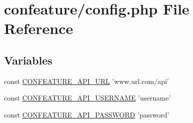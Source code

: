 \hypertarget{config_8php}{\section{confeature/config.php File Reference}
\label{config_8php}
}
\subsection*{Variables}
\begin{DoxyCompactItemize}
\item 
const \hyperlink{config_8php_afbb16ca52762e87195663d3710de52cc}{C\-O\-N\-F\-E\-A\-T\-U\-R\-E\-\_\-\-A\-P\-I\-\_\-\-U\-R\-L} 'www.\-url.\-com/api'
\item 
const \hyperlink{config_8php_a55bed016da931f1b594652961ba39156}{C\-O\-N\-F\-E\-A\-T\-U\-R\-E\-\_\-\-A\-P\-I\-\_\-\-U\-S\-E\-R\-N\-A\-M\-E} 'username'
\item 
const \hyperlink{config_8php_aabf368f92feaf5867e6ff1fabff50ac4}{C\-O\-N\-F\-E\-A\-T\-U\-R\-E\-\_\-\-A\-P\-I\-\_\-\-P\-A\-S\-S\-W\-O\-R\-D} 'password'
\end{DoxyCompactItemize}


